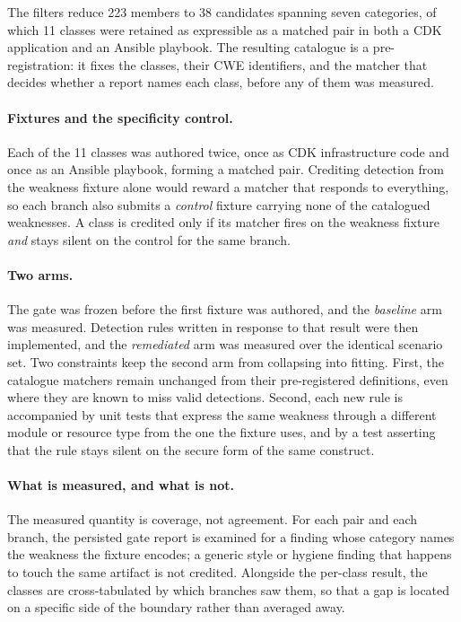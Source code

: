 The filters reduce 223 members to 38 candidates spanning seven categories, of
which 11 classes were retained as expressible as a matched pair in both a CDK
application and an Ansible playbook. The resulting catalogue is a
pre-registration: it fixes the classes, their CWE identifiers, and the matcher
that decides whether a report names each class, before any of them was measured.

\paragraph{Fixtures and the specificity control.}
Each of the 11 classes was authored twice, once as CDK infrastructure code and
once as an Ansible playbook, forming a matched pair. Crediting detection from
the weakness fixture alone would reward a matcher that responds to everything,
so each branch also submits a \emph{control} fixture carrying none of the
catalogued weaknesses. A class is credited only if its matcher fires on the
weakness fixture \emph{and} stays silent on the control for the same branch.

\paragraph{Two arms.}
The gate was frozen before the first fixture was authored, and the
\emph{baseline} arm was measured. Detection rules written in response to that
result were then implemented, and the \emph{remediated} arm was measured over
the identical scenario set. Two constraints keep the second arm from collapsing
into fitting. First, the catalogue matchers remain unchanged from their
pre-registered definitions, even where they are known to miss valid detections.
Second, each new rule is accompanied by unit tests that express the same
weakness through a different module or resource type from the one the fixture
uses, and by a test asserting that the rule stays silent on the secure form of
the same construct.

\paragraph{What is measured, and what is not.}
The measured quantity is coverage, not agreement. For each pair and each branch,
the persisted gate report is examined for a finding whose category names the
weakness the fixture encodes; a generic style or hygiene finding that happens to
touch the same artifact is not credited. Alongside the
per-class result, the classes are cross-tabulated by which branches saw them, so
that a gap is located on a specific side of the boundary rather than averaged
away.

